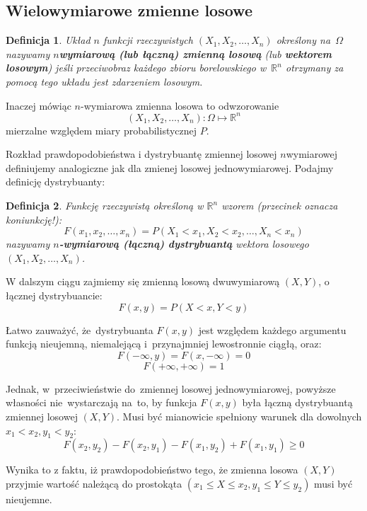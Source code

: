 \documentclass[10pt,a4paper]{article}
\newtheorem{definition}{Definicja}[section]
\numberwithin{equation}{subsection}
\begin{document}
\subsection{Wielowymiarowe zmienne losowe}

\begin{definition}
  Układ $n$ funkcji rzeczywistych $(X_1,X_2,\dotsc,X_n)$ określony na~$\Omega$
  nazywamy \textbf{$n$\dywiz wymiarową (lub łączną) zmienną losową}
  (lub \textbf{wektorem losowym}) jeśli przeciwobraz każdego zbioru
  borelowskiego w~$\mathbb{R}^n$ otrzymany za pomocą tego układu jest zdarzeniem
  losowym.
\end{definition}

Inaczej mówiąc $n$-wymiarowa zmienna losowa to odwzorowanie
\[
  (X_1,X_2,\dotsc,X_n):\Omega \mapsto \mathbb{R}^n
\]
mierzalne względem miary probabilistycznej $P$.

Rozkład prawdopodobieństwa i dystrybuantę zmiennej losowej $n$\dywiz wymiarowej
definiujemy analogiczne jak dla zmienej losowej jednowymiarowej. Podajmy
definicję dystrybuanty:
\begin{definition}
  Funkcję rzeczywistą  określoną w $\mathbb{R}^n$ wzorem (przecinek oznacza
  koniunkcję!):
  \[
    F(x_1, x_2,\dotsc, x_n) = P(X_1 < x_1, X_2 < x_2,\dotsc, X_n < x_n)
  \]
  nazywamy \textbf{$n$-wymiarową (łączną) dystrybuantą} wektora
  losowego $(X_1,X_2,\dotsc,X_n)$.
\end{definition}

W dalszym ciągu zajmiemy się zmienną losową dwuwymiarową $(X,Y)$, o łącznej
dystrybuancie:
\[
  F(x,y) = P(X<x, Y<y)
\]

Łatwo zauważyć, że~dystrybuanta $F(x,y)$ jest względem każdego argumentu funkcją
nieujemną, niemalejącą i~przynajmniej lewostronnie ciągłą, oraz:
\[
  F(-\infty, y) = F(x, -\infty) = 0
\]
\[
  F(+\infty, +\infty) = 1
\]

Jednak, w~przeciwieństwie do~zmiennej losowej jednowymiarowej, powyższe własności
nie~wystarczają na~to, by funkcja $F(x,y)$ była łączną dystrybuantą zmiennej
losowej $(X,Y)$. Musi być mianowicie spełniony warunek dla dowolnych
$x_1 < x_2, y_1 < y_2$:
\begin{equation}
  F(x_2,y_2)-F(x_2, y_1) - F(x_1, y_2) + F(x_1, y_1) \geq 0
\end{equation}

Wynika to z faktu, iż prawdopodobieństwo tego, że zmienna losowa $(X,Y)$
przyjmie wartość należącą do prostokąta $(x_1\leq X\leq x_2, y_1\leq Y\leq y_2)$
musi być nieujemne.
\end{document}
